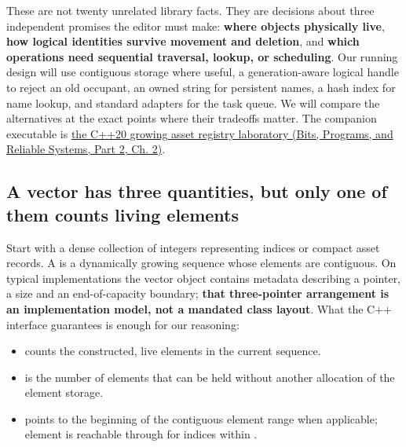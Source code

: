 These are not twenty unrelated library facts. They are decisions about three independent promises the editor must make: \textbf{where objects physically live}, \textbf{how logical identities survive movement and deletion}, and \textbf{which operations need sequential traversal, lookup, or scheduling}. Our running design will use contiguous storage where useful, a generation-aware logical handle to reject an old occupant, an owned string for persistent names, a hash index for name lookup, and standard adapters for the task queue. We will compare the alternatives at the exact points where their tradeoffs matter. The companion executable is \href{../01-Bits-Programs-and-Reliable-Systems-P02/main.pdf\#nameddest=source-file-e829cf731b17419e282775cf}{the C++20 growing asset registry laboratory (Bits, Programs, and Reliable Systems, Part 2, Ch. 2)}.

\subsection{A vector has three quantities, but only one of them counts living elements}\label{05-engine-i-ch005-a-vector-has-three-quantities-but-only-one-of-them-counts-living-elements}

\hypertarget{05-engine-i-ch005-a-vector-has-three-quantities-but-only-one-of-them-counts-living-elements}{}

Start with a dense collection of integers representing indices or compact asset records. A  is a dynamically growing sequence whose elements are contiguous. On typical implementations the vector object contains metadata describing a pointer, a size and an end-of-capacity boundary; \textbf{that three-pointer arrangement is an implementation model, not a mandated class layout}. What the C++ interface guarantees is enough for our reasoning:

\begin{itemize}
\tightlist
\item
   counts the constructed, live elements in the current sequence.
\item
   is the number of elements that can be held without another allocation of the element storage.
\item
   points to the beginning of the contiguous element range when applicable; element  is reachable through  for indices within \BookInlineCode{{[}0,size())}.
\end{itemize}

